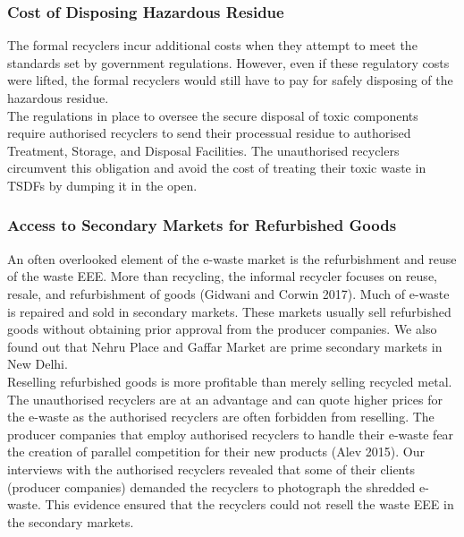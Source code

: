 \documentclass[a4paper, 12pt]{article}
\begin{document}
                    \subsubsection{Cost of Disposing Hazardous Residue }
                    
                    The formal recyclers incur additional costs when they attempt to meet the standards set by government regulations. However, even if these regulatory costs were lifted, the formal recyclers would still have to pay for safely disposing of the hazardous residue.\\
                     
                    The regulations in place to oversee the secure disposal of toxic components require authorised recyclers to send their processual residue to authorised Treatment, Storage, and Disposal Facilities. The unauthorised recyclers circumvent this obligation and avoid the cost of treating their toxic waste in TSDFs by dumping it in the open.\\
                    
                    \subsubsection{Access to Secondary Markets for Refurbished Goods}
                    
                    An often overlooked element of the e-waste market is the refurbishment and reuse of the waste EEE. More than recycling, the informal recycler focuses on reuse, resale, and refurbishment of goods (Gidwani and Corwin 2017). Much of e-waste is repaired and sold in secondary markets. These markets usually sell refurbished goods without obtaining prior approval from the producer companies. We also found out that Nehru Place and Gaffar Market are prime secondary markets in New Delhi. \\
                    
                    Reselling refurbished goods is more profitable than merely selling recycled metal. The unauthorised recyclers are at an advantage and can quote higher prices for the e-waste as the authorised recyclers are often forbidden from reselling. The producer companies that employ authorised recyclers to handle their e-waste fear the creation of parallel competition for their new products (Alev 2015). Our interviews with the authorised recyclers revealed that some of their clients (producer companies) demanded the recyclers to photograph the shredded e-waste. This evidence ensured that the recyclers could not resell the waste EEE in the secondary markets. \\
                    
\end{document}
